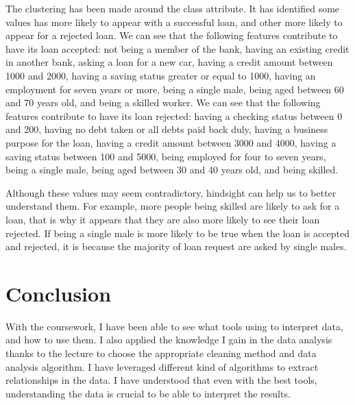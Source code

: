 \documentclass[12pt, a4paper]{article}
\begin{document}
The clustering has been made around the class attribute. It has identified some values has more likely to appear with a successful loan, and other more likely to appear for a rejected loan. 
We can see that the following features contribute to have its loan accepted: not being a member of the bank, having an existing credit in another bank, asking a loan for a new car, having a credit amount between 1000 and 2000, having a saving status greater or equal to 1000, having an employment for seven years or more, being a single male, being aged between 60 and 70 years old, and being a skilled worker.
We can see that the following features contribute to have its loan rejected: having a checking status between 0 and 200, having no debt taken or all debts paid back duly, having a business purpose for the loan, having a credit amount between 3000 and 4000, having a saving status between 100 and 5000, being employed for four to seven years, being a single male, being aged between 30 and 40 years old, and being skilled.

Although these values may seem contradictory, hindsight can help us to better understand them. For example, more people being skilled are likely to ask for a loan, that is why it appears that they are also more likely to see their loan rejected. If being a single male is more likely to be true when the loan is accepted and rejected, it is because the majority of loan request are asked by single males.

\section{Conclusion}
With the coursework, I have been able to see what tools using to interpret data, and how to use them. I also applied the knowledge I gain in the data analysis thanks to the lecture to choose the appropriate cleaning method and data analysis algorithm. I have leveraged different kind of algorithms to extract relationships in the data. I have understood that even with the best tools, understanding the data is crucial to be able to interpret the results.
\end{document}
